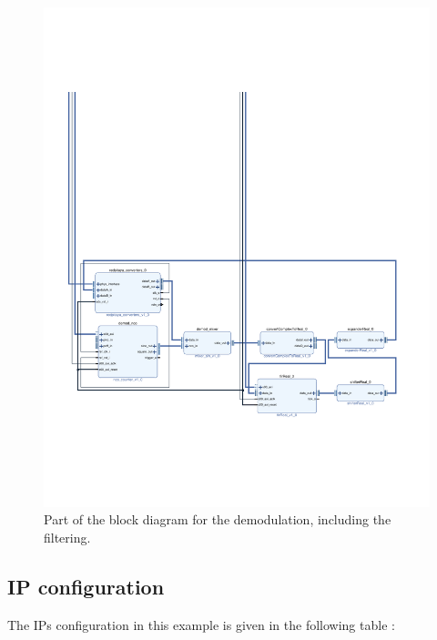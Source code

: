 \documentclass[12pt,oneside]{article}
\begin{document}
\begin{figure}[h!tb]
	\begin{center}
		\includegraphics[width=15cm,trim={1.3cm 5cm 1.5cm 13.8cm}, clip]{design/demod.pdf}
		\caption{Part of the block diagram for the demodulation, including the filtering.}
		\label{fig:demod}
	\end{center}
\end{figure}

\vspace{-0.3cm}
\subsection{IP configuration}

The IPs configuration in this example is given in the following table :
\end{document}
